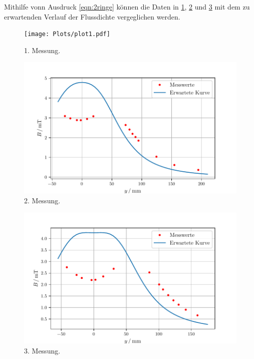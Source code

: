 Mithilfe vonn Ausdruck \eqref{eqn:2ringe} können die Daten in \ref{fig:1mess}, \ref{fig:2mess} und \ref{fig:3mess}  mit dem zu erwartenden Verlauf der Flussdichte vergeglichen werden.
\begin{figure}
    \centering
    \texttt{[image: Plots/plot1.pdf]}
    \caption{1. Messung.}
    \label{fig:1mess}
\end{figure}
\begin{figure}
    \centering
    \includegraphics[width=\textwidth]{Plots/plot2.pdf}
    \caption{2. Messung.}
    \label{fig:2mess}
\end{figure}
\begin{figure}
    \centering
    \includegraphics[width=\textwidth]{Plots/plot3.pdf}
    \caption{3. Messung.}
    \label{fig:3mess}
\end{figure}
\pagebreak
